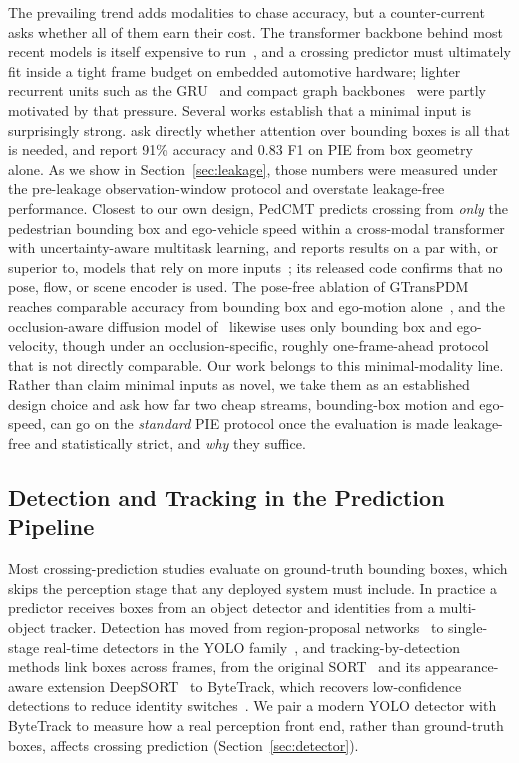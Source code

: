 \documentclass[mti,article,submit,moreauthors]{Definitions/mdpi}
\begin{document}
The prevailing trend adds modalities to chase accuracy, but a counter-current asks whether all of them earn their cost. The transformer backbone behind most recent models is itself expensive to run~\citep{vaswani2017attention}, and a crossing predictor must ultimately fit inside a tight frame budget on embedded automotive hardware; lighter recurrent units such as the GRU~\citep{cho2014gru} and compact graph backbones~\citep{cadena2022pedgraph} were partly motivated by that pressure. Several works establish that a minimal input is surprisingly strong. \citet{achaji2022attention} ask directly whether attention over bounding boxes is all that is needed, and report 91\% accuracy and 0.83 F1 on PIE from box geometry alone. As we show in Section~\ref{sec:leakage}, those numbers were measured under the pre-leakage observation-window protocol and overstate leakage-free performance. Closest to our own design, PedCMT predicts crossing from \emph{only} the pedestrian bounding box and ego-vehicle speed within a cross-modal transformer with uncertainty-aware multitask learning, and reports results on a par with, or superior to, models that rely on more inputs~\citep{chen2024pedcmt}; its released code confirms that no pose, flow, or scene encoder is used. The pose-free ablation of GTransPDM reaches comparable accuracy from bounding box and ego-motion alone~\citep{xie2025gtranspdm}, and the occlusion-aware diffusion model of~\citet{liu2025occlusion} likewise uses only bounding box and ego-velocity, though under an occlusion-specific, roughly one-frame-ahead protocol that is not directly comparable. Our work belongs to this minimal-modality line. Rather than claim minimal inputs as novel, we take them as an established design choice and ask how far two cheap streams, bounding-box motion and ego-speed, can go on the \emph{standard} PIE protocol once the evaluation is made leakage-free and statistically strict, and \emph{why} they suffice.

\subsection{Detection and Tracking in the Prediction Pipeline}

Most crossing-prediction studies evaluate on ground-truth bounding boxes, which skips the perception stage that any deployed system must include. In practice a predictor receives boxes from an object detector and identities from a multi-object tracker. Detection has moved from region-proposal networks~\citep{ren2015faster} to single-stage real-time detectors in the YOLO family~\citep{redmon2016yolo,jocher2025yolo}, and tracking-by-detection methods link boxes across frames, from the original SORT~\citep{bewley2016sort} and its appearance-aware extension DeepSORT~\citep{wojke2017deepsort} to ByteTrack, which recovers low-confidence detections to reduce identity switches~\citep{zhang2022bytetrack}. We pair a modern YOLO detector with ByteTrack to measure how a real perception front end, rather than ground-truth boxes, affects crossing prediction (Section~\ref{sec:detector}).
\end{document}
